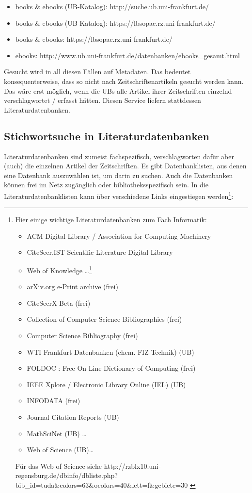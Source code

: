 \documentclass[
  DIV=calc,
  BCOR=5mm,
  11pt,
  headings=small,
  oneside,
  abstract=true,
  toc=bib,
  english,ngerman]{scrartcl}
\begin{document}
\begin{itemize}
  \item books \& ebooks (UB-Katalog): {\ttfamily
  http://suche.ub.uni-frankfurt.de/}
  \item books \& ebooks (UB-Katalog): {\small \ttfamily
  https://lbsopac.rz.uni-frankfurt.de/}
  \item books \& ebooks: {\ttfamily
  https://lbsopac.rz.uni-frankfurt.de/}
  \item ebooks: {\ttfamily \tiny
  http://www.ub.uni-frankfurt.de/datenbanken/ebooks\_gesamt.html}
\end{itemize}

Gesucht wird in all diesen Fällen auf Metadaten. Das bedeutet konsequenterweise,
dass so nicht nach Zeitschriftenartikeln gesucht werden kann. Das wäre erst
möglich, wenn die UBs alle Artikel ihrer Zeitschriften einzelnd
verschlagwortet / erfasst hätten. Diesen Service liefern stattdessen
Literaturdatenbanken.

\subsection{Stichwortsuche in Literaturdatenbanken}

Literaturdatenbanken sind zumeist fachspezifisch, verschlagworten dafür
aber (auch) die einzelnen Artikel der Zeitschriften. Es gibt Datenbanklisten,
aus denen eine Datenbank auszuwählen ist, um darin zu suchen. Auch die
Datenbanken können frei im Netz zugänglich oder bibliotheksspezifisch sein. In
die Literaturdatenbanklisten kann über verschiedene Links eingestiegen werden\footnote{
Hier einige wichtige Literaturdatenbanken zum Fach Informatik:
\begin{itemize}
  \item ACM Digital Library / Association for Computing Machinery
  \item CiteSeer.IST Scientific Literature Digital Library
  \item Web of Knowledge \ldots\footnote{ \tiny vgl. {\ttfamily
  http://info.ub.uni-frankfurt.de/fach\_liste.html?fach=informatik }}
  \item arXiv.org e-Print archive (frei)
  \item CiteSeerX Beta 	(frei)
  \item Collection of Computer Science Bibliographies (frei)
  \item Computer Science Bibliography (frei)
  \item WTI-Frankfurt Datenbanken (ehem. FIZ Technik) (UB)
  \item FOLDOC : Free On-Line Dictionary of Computing (frei)
  \item IEEE Xplore / Electronic Library Online (IEL) (UB)
  \item INFODATA (frei)
  \item Journal Citation Reports (UB)
  \item MathSciNet (UB) \ldots
  \item Web of Science (UB)\ldots
\end{itemize}
Für das Web of Science siehe {\ttfamily 
http://rzblx10.uni-regensburg.de/dbinfo/dbliste.php?
bib\_id=tuda\&colors=63\&ocolors=40\&lett=f\&gebiete=30
}

}:
\end{document}
